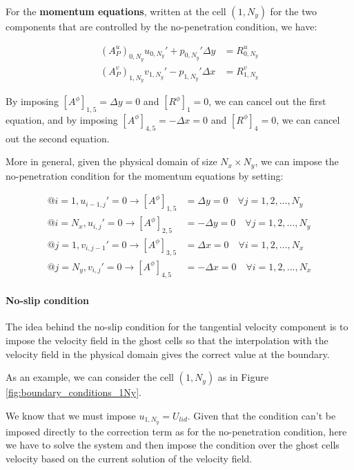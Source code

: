 For the \textbf{momentum equations}, written at the cell $(1, N_y)$ for the two components that are controlled by the no-penetration condition, we have:

\begin{align}
    (A_P^u)_{0,N_y} u_{0,N_y}' + p_{0,N_y}' \Delta y & = R^u_{0,N_y} \\
    (A_P^v)_{1,N_y} v_{1,N_y}' - p_{1,N_y}' \Delta x & = R^v_{1,N_y}
\end{align}

By imposing $[A^\phi]_{1,5} = \Delta y = 0$ and $[R^\phi]_{1} = 0$, we can cancel out the first equation, and by imposing $[A^\phi]_{4,5} = - \Delta x = 0$ and $[R^\phi]_{4} = 0$, we can cancel out the second equation.

More in general, given the physical domain of size $N_x \times N_y$, we can impose the no-penetration condition for the momentum equations by setting:

\begin{align}
    @i=1, u_{i-1, j}' = 0 \rightarrow [A^\phi]_{1,5} & = \Delta y = 0 \quad \forall j = 1,2,...,N_y   \\
    @i=N_x, u_{i, j}' = 0 \rightarrow [A^\phi]_{2,5} & = - \Delta y = 0 \quad \forall j = 1,2,...,N_y \\
    @j=1, v_{i, j-1}' = 0 \rightarrow [A^\phi]_{3,5} & = \Delta x = 0 \quad \forall i = 1,2,...,N_x   \\
    @j=N_y, v_{i, j}' = 0 \rightarrow [A^\phi]_{4,5} & = - \Delta x = 0 \quad \forall i = 1,2,...,N_x
\end{align}

\paragraph{No-slip condition}

The idea behind the no-slip condition for the tangential velocity component is to impose the velocity field in the ghost cells so that the interpolation with the velocity field in the physical domain gives the correct value at the boundary.

As an example, we can consider the cell $(1, N_y)$ as in Figure \ref{fig:boundary_conditions_1Ny}.

We know that we must impose $u_{1, N_y} = U_{lid}$.
Given that the condition can't be imposed directly to the correction term as for the no-penetration condition, here we have to solve the system and then impose the condition over the ghost cells velocity based on the current solution of the velocity field.

